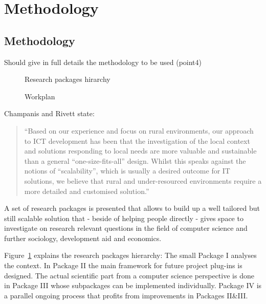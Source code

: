 \documentclass[11pt]{article}
\begin{document}
\section{Methodology}\label{methodology}
\subsection{Methodology}\label{metho}
Should give in full details the methodology to be used (point4)
\begin{figure}
\begin{center}
 
\end{center}
\caption{Research packages hirarchy}
\label{tikz:researchpackages}
\end{figure} 

\begin{figure}
\begin{center}
 
\end{center}
\caption{Workplan}
\label{tikz:workplan}
\end{figure} 

Champanis and Rivett 
\citet{champanis2012reporting} state: \begin{quote}
``Based on our experience and focus on rural environments, our
approach to ICT development has been that the investigation of
the local context and solutions responding to local needs are more
valuable and sustainable than a general “one-size-fits-all” design.
Whilst this speaks against the notions of “scalability”, which is
usually a desired outcome for IT solutions, we believe that rural
and under-resourced environments require a more detailed and
customised solution.''\end{quote} 

A set of research packages is presented that allows to build up a well tailored but still scalable solution that - beside of helping people directly -  gives space to investigate on research relevant questions in the field of computer science and further sociology, development aid and economics. 

Figure~\ref{tikz:researchpackages} explains the research packages hierarchy: The small Package I analyses the context. In Package II the main framework for future project plug-ins is designed. The actual scientific part from a computer science perspective is done in Package III whose subpackages can be implemented individually. Package IV is a parallel ongoing process that profits from improvements in Packages II\&III.
\end{document}
